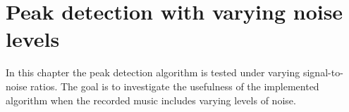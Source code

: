 \chapter{Peak detection with varying noise levels}
In this chapter the peak detection algorithm is tested under varying signal-to-noise ratios. The goal is to investigate the usefulness of the implemented algorithm when the recorded music includes varying levels of noise.
